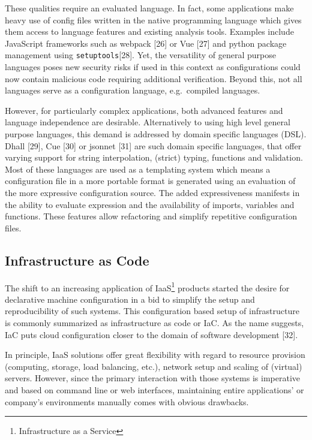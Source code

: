 \documentclass[
  a4paper,
  bibtex,
  english,
  nomenclature]{kthlatex/kththesis/kththesis}
\begin{document}
These qualities require an evaluated language. In fact, some
applications make heavy use of config files written in the native
programming language which gives them access to language features and
existing analysis tools. Examples include JavaScript frameworks such as
webpack {[}26{]} or Vue {[}27{]} and python package management using
\texttt{setuptools}{[}28{]}. Yet, the versatility of general purpose
languages poses new security risks if used in this context as
configurations could now contain malicious code requiring additional
verification. Beyond this, not all languages serve as a configuration
language, e.g.~compiled languages.

However, for particularly complex applications, both advanced features
and language independence are desirable. Alternatively to using high
level general purpose languages, this demand is addressed by domain
specific languages (DSL). Dhall {[}29{]}, Cue {[}30{]} or jsonnet
{[}31{]} are such domain specific languages, that offer varying support
for string interpolation, (strict) typing, functions and validation.
Most of these languages are used as a templating system which means a
configuration file in a more portable format is generated using an
evaluation of the more expressive configuration source. The added
expressiveness manifests in the ability to evaluate expression and the
availability of imports, variables and functions. These features allow
refactoring and simplify repetitive configuration files.

\hypertarget{sec:infrastructure-as-code}{%
\subsection{Infrastructure as Code}\label{sec:infrastructure-as-code}}

The shift to an increasing application of IaaS\footnote{Infrastructure
  as a Service} products started the desire for declarative machine
configuration in a bid to simplify the setup and reproducibility of such
systems. This configuration based setup of infrastructure is commonly
summarized as infrastructure as code or IaC. As the name suggests, IaC
puts cloud configuration closer to the domain of software development
{[}32{]}.

In principle, IaaS solutions offer great flexibility with regard to
resource provision (computing, storage, load balancing, etc.), network
setup and scaling of (virtual) servers. However, since the primary
interaction with those systems is imperative and based on command line
or web interfaces, maintaining entire applications' or company's
environments manually comes with obvious drawbacks.
\end{document}
